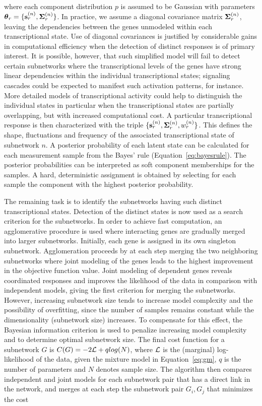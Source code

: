 \noindent where each component distribution $p$ is assumed to be
Gaussian with parameters \(\boldsymbol{\theta}_r = \{\mathbf{s}_{r}^{(n)}, \boldsymbol{\Sigma}_{r}^{(n)}\}\).  In practice,
we assume a diagonal covariance matrix \(\boldsymbol{\Sigma}_{r}^{(n)}\), leaving the
dependencies between the genes unmodeled within each transcriptional
state. Use of diagonal covariances is justified by considerable gains
in computational efficiency when the detection of distinct responses
is of primary interest. It is possible, however, that such simplified
model will fail to detect certain subnetworks where the
transcriptional levels of the genes have strong linear dependencies
within the individual transcriptional states; signaling cascades
could be expected to manifest such activation patterns, for
instance. More detailed models of transcriptional activity could help
to distinguish the individual states in particular when the
transcriptional states are partially overlapping, but with increased
computational cost. A particular transcriptional response is then
characterized with the triple \(\{\mathbf{s}_{r}^{(n)}, \boldsymbol{\Sigma}_{r}^{(n)}, w_{r}^{(n)}\}\). This defines
the shape, fluctuations and frequency of the associated
transcriptional state of subnetwork \(n\).  A posterior probability of
each latent state can be calculated for each measurement sample from
the Bayes' rule (Equation~\ref{eq:bayesrule}). The posterior
probabilities can be interpreted as soft component memberships for the
samples. A hard, deterministic assignment is obtained by selecting for
each sample the component with the highest posterior probability.

The remaining task is to identify the subnetworks having such distinct
transcriptional states. Detection of the distinct states is now used
as a search criterion for the subnetworks. In order to achieve fast
computation, an agglomerative procedure is used where interacting
genes are gradually merged into larger subnetworks.  Initially, each
gene is assigned in its own singleton subnetwork. Agglomeration
proceeds by at each step merging the two neighboring subnetworks where
joint modeling of the genes leads to the highest improvement in the
objective function value. Joint modeling of dependent genes reveals
coordinated responses and improves the likelihood of the data in
comparison with independent models, giving the first criterion for
merging the subnetworks. However, increasing subnetwork size tends to
increase model complexity and the possibility of overfitting, since
the number of samples remains constant while the dimensionality
(subnetwork size) increases. To compensate for this effect, the
Bayesian information criterion \citep[see][]{Gelman03} is used to
penalize increasing model complexity and to determine optimal
subnetwork size. The final cost function for a subnetwork \(G\) is
\(C(G) = - 2{\cal L} + q log(N)\), where \({\cal L}\) is the (marginal)
log-likelihood of the data, given the mixture model in
Equation~\ref{eq:gm}, \(q\) is the number of parameters and \(N\) denotes
sample size. The algorithm then compares independent and joint models
for each subnetwork pair that has a direct link in the network, and
merges at each step the subnetwork pair \(G_i, G_j\) that minimizes
the cost

